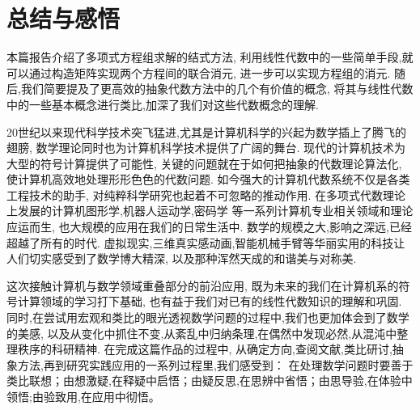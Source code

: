 \section{总结与感悟}
	本篇报告介绍了多项式方程组求解的结式方法,
	利用线性代数中的一些简单手段,就可以通过构造矩阵实现两个方程间的联合消元,
	进一步可以实现方程组的消元.
	随后,我们简要提及了更高效的抽象代数方法中的几个有价值的概念,
	将其与线性代数中的一些基本概念进行类比,加深了我们对这些代数概念的理解.

	20世纪以来现代科学技术突飞猛进,尤其是计算机科学的兴起为数学插上了腾飞的翅膀,
	数学理论同时也为计算机科学技术提供了广阔的舞台.
	现代的计算机技术为大型的符号计算提供了可能性,
	关键的问题就在于如何把抽象的代数理论算法化, 
	使计算机高效地处理形形色色的代数问题. 
	如今强大的计算机代数系统不仅是各类工程技术的助手,
	对纯粹科学研究也起着不可忽略的推动作用.
	在多项式代数理论上发展的计算机图形学,机器人运动学,密码学
	等一系列计算机专业相关领域和理论应运而生,
	也大规模的应用在我们的日常生活中.
	数学的规模之大,影响之深远,已经超越了所有的时代.
	虚拟现实,三维真实感动画,智能机械手臂等华丽实用的科技让人们切实感受到了数学博大精深,
	以及那种浑然天成的和谐美与对称美.
	
	这次接触计算机与数学领域重叠部分的前沿应用,
	既为未来的我们在计算机系的符号计算领域的学习打下基础,
	也有益于我们对已有的线性代数知识的理解和巩固.
	同时,在尝试用宏观和类比的眼光透视数学问题的过程中,我们也更加体会到了数学的美感,
	以及从变化中抓住不变,从紊乱中归纳条理,在偶然中发现必然,从混沌中整理秩序的科研精神.
	在完成这篇作品的过程中,
	从确定方向,查阅文献,类比研讨,抽象方法,再到研究实践应用的一系列过程里,我们感受到：
	在处理数学问题时要善于类比联想；由想激疑,在释疑中启悟；由疑反思,在思辨中省悟；由思导验,在体验中领悟;由验致用,在应用中彻悟。
